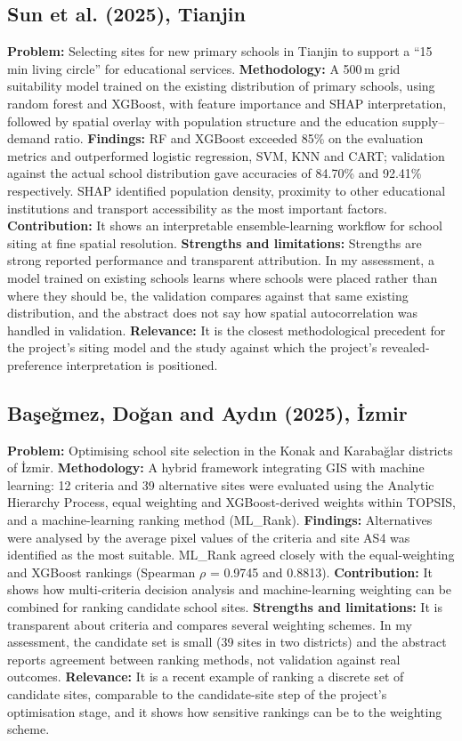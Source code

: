 \documentclass[pdflatex,sn-mathphys-num]{sn-jnl}
\begin{document}
\subsection{Sun et al. (2025), Tianjin \cite{tianjin2025}}
\textbf{Problem:} Selecting sites for new primary schools in Tianjin to support a ``15 min living circle'' for educational services.
\textbf{Methodology:} A 500\,m grid suitability model trained on the existing distribution of primary schools, using random forest and XGBoost, with feature importance and SHAP interpretation, followed by spatial overlay with population structure and the education supply--demand ratio.
\textbf{Findings:} RF and XGBoost exceeded 85\% on the evaluation metrics and outperformed logistic regression, SVM, KNN and CART; validation against the actual school distribution gave accuracies of 84.70\% and 92.41\% respectively. SHAP identified population density, proximity to other educational institutions and transport accessibility as the most important factors.
\textbf{Contribution:} It shows an interpretable ensemble-learning workflow for school siting at fine spatial resolution.
\textbf{Strengths and limitations:} Strengths are strong reported performance and transparent attribution. In my assessment, a model trained on existing schools learns where schools were placed rather than where they should be, the validation compares against that same existing distribution, and the abstract does not say how spatial autocorrelation was handled in validation.
\textbf{Relevance:} It is the closest methodological precedent for the project's siting model and the study against which the project's revealed-preference interpretation is positioned.

\subsection{Ba\c{s}e\u{g}mez, Do\u{g}an and Ayd\i{}n (2025), \.{I}zmir \cite{schoolsiting2025}}
\textbf{Problem:} Optimising school site selection in the Konak and Karaba\u{g}lar districts of \.{I}zmir.
\textbf{Methodology:} A hybrid framework integrating GIS with machine learning: 12 criteria and 39 alternative sites were evaluated using the Analytic Hierarchy Process, equal weighting and XGBoost-derived weights within TOPSIS, and a machine-learning ranking method (ML\_Rank).
\textbf{Findings:} Alternatives were analysed by the average pixel values of the criteria and site AS4 was identified as the most suitable. ML\_Rank agreed closely with the equal-weighting and XGBoost rankings (Spearman $\rho$ = 0.9745 and 0.8813).
\textbf{Contribution:} It shows how multi-criteria decision analysis and machine-learning weighting can be combined for ranking candidate school sites.
\textbf{Strengths and limitations:} It is transparent about criteria and compares several weighting schemes. In my assessment, the candidate set is small (39 sites in two districts) and the abstract reports agreement between ranking methods, not validation against real outcomes.
\textbf{Relevance:} It is a recent example of ranking a discrete set of candidate sites, comparable to the candidate-site step of the project's optimisation stage, and it shows how sensitive rankings can be to the weighting scheme.
\end{document}
